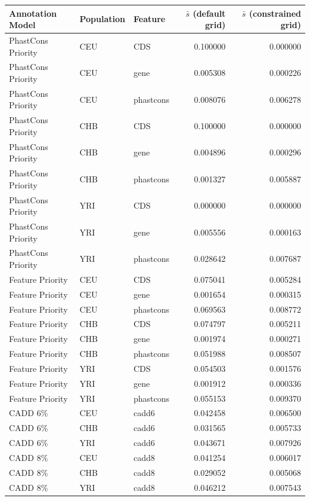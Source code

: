 \documentclass[11pt]{article}
\begin{document}
\begin{tabular}{|l|llrr|}
\hline
Annotation Model &  Population &    Feature &   ${\bar{s}}$ (default grid) & ${\bar{s}}$ (constrained grid) \\
\hline
PhastCons Priority & CEU &       CDS &         0.100000 &       0.000000 \\
PhastCons Priority & CEU &      gene &         0.005308 &       0.000226 \\
PhastCons Priority & CEU & phastcons &         0.008076 &       0.006278 \\
PhastCons Priority & CHB &       CDS &         0.100000 &       0.000000 \\
PhastCons Priority & CHB &      gene &         0.004896 &       0.000296 \\
PhastCons Priority & CHB & phastcons &         0.001327 &       0.005887 \\
PhastCons Priority & YRI &       CDS &         0.000000 &       0.000000 \\
PhastCons Priority & YRI &      gene &         0.005556 &       0.000163 \\
PhastCons Priority & YRI & phastcons &         0.028642 &       0.007687 \\
  Feature Priority & CEU &       CDS &         0.075041 &       0.005284 \\
  Feature Priority & CEU &      gene &         0.001654 &       0.000315 \\
  Feature Priority & CEU & phastcons &         0.069563 &       0.008772 \\
  Feature Priority & CHB &       CDS &         0.074797 &       0.005211 \\
  Feature Priority & CHB &      gene &         0.001974 &       0.000271 \\
  Feature Priority & CHB & phastcons &         0.051988 &       0.008507 \\
  Feature Priority & YRI &       CDS &         0.054503 &       0.001576 \\
  Feature Priority & YRI &      gene &         0.001912 &       0.000336 \\
  Feature Priority & YRI & phastcons &         0.055153 &       0.009370 \\
           CADD 6\% & CEU &     cadd6 &         0.042458 &       0.006500 \\
           CADD 6\% & CHB &     cadd6 &         0.031565 &       0.005733 \\
           CADD 6\% & YRI &     cadd6 &         0.043671 &       0.007926 \\
           CADD 8\% & CEU &     cadd8 &         0.041254 &       0.006017 \\
           CADD 8\% & CHB &     cadd8 &         0.029052 &       0.005068 \\
           CADD 8\% & YRI &     cadd8 &         0.046212 &       0.007543 \\
\hline
\end{tabular}
\end{document}
